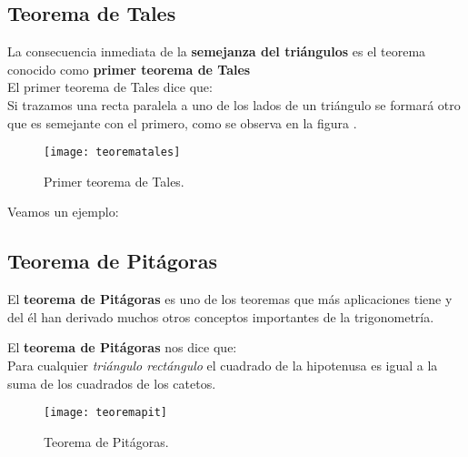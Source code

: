 
\subsection{Teorema de Tales}

La consecuencia inmediata de la \textbf{semejanza del triángulos} es el
teorema conocido como \textbf{primer teorema de Tales}
\\

El primer teorema de Tales dice que:\\

Si trazamos una recta paralela a uno de los lados de un triángulo se formará
otro que es semejante con el primero, como se observa en la figura 
.

\begin{figure}[ht!]
	\texttt{[image: teorematales]}
	\caption[teorematales]{Primer teorema de Tales.}
\end{figure}

Veamos un ejemplo:


\subsection{Teorema de Pitágoras}

El \textbf{teorema de Pitágoras} es uno de los teoremas que más aplicaciones 
tiene y del él han derivado muchos otros conceptos importantes de la 
trigonometría. 


El \textbf{teorema de Pitágoras} nos dice que:\\

Para cualquier \textit{triángulo rectángulo} el cuadrado de la hipotenusa
 es 
igual a la suma de los cuadrados de los catetos.

\begin{figure}[ht!]
	\texttt{[image: teoremapit]}
	\caption[teoremapit]{Teorema de Pitágoras.}
\end{figure}

